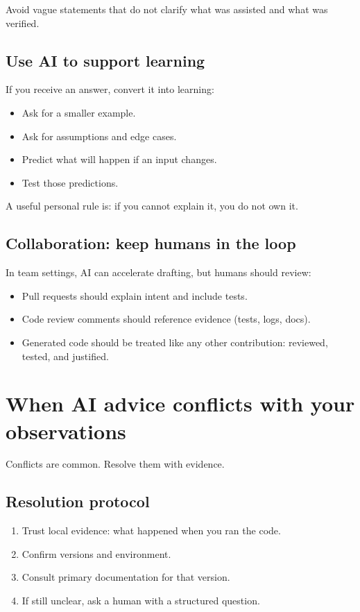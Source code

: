 Avoid vague statements that do not clarify what was assisted and what was verified.

\subsection{Use AI to support learning}
If you receive an answer, convert it into learning:
\begin{itemize}[noitemsep]
  \item Ask for a smaller example.
  \item Ask for assumptions and edge cases.
  \item Predict what will happen if an input changes.
  \item Test those predictions.
\end{itemize}

A useful personal rule is: if you cannot explain it, you do not own it.

\subsection{Collaboration: keep humans in the loop}
In team settings, AI can accelerate drafting, but humans should review:
\begin{itemize}[noitemsep]
  \item Pull requests should explain intent and include tests.
  \item Code review comments should reference evidence (tests, logs, docs).
  \item Generated code should be treated like any other contribution: reviewed, tested, and justified.
\end{itemize}

\section{When AI advice conflicts with your observations}
Conflicts are common. Resolve them with evidence.

\subsection{Resolution protocol}
\begin{enumerate}[noitemsep]
  \item Trust local evidence: what happened when you ran the code.
  \item Confirm versions and environment.
  \item Consult primary documentation for that version.
  \item If still unclear, ask a human with a structured question.
\end{enumerate}

